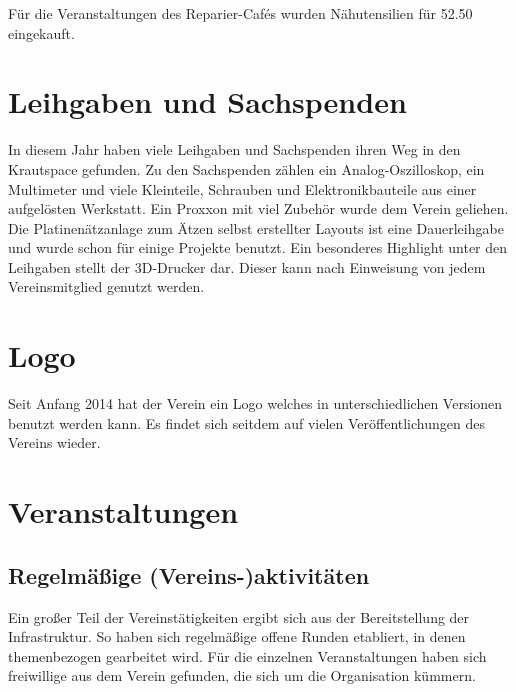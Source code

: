 \documentclass[ngerman,10pt,DIV16]{scrartcl}
\begin{document}
Für die Veranstaltungen des Reparier-Cafés wurden Nähutensilien für \SI{52,50}{\EUR} eingekauft.

\section{Leihgaben und Sachspenden}

In diesem Jahr haben viele Leihgaben und Sachspenden ihren Weg in den Krautspace gefunden. 
Zu den Sachspenden zählen ein Analog-Oszilloskop, ein Multimeter und viele Kleinteile, Schrauben und Elektronikbauteile aus einer aufgelösten Werkstatt.
Ein Proxxon mit viel Zubehör wurde dem Verein geliehen.
Die Platinenätzanlage zum Ätzen selbst erstellter Layouts ist eine Dauerleihgabe und wurde schon für einige Projekte benutzt.
Ein besonderes Highlight unter den Leihgaben stellt der 3D-Drucker dar.
Dieser kann nach Einweisung von jedem Vereinsmitglied genutzt werden.

\section{Logo}

Seit Anfang 2014 hat der Verein ein Logo welches in unterschiedlichen Versionen benutzt werden kann. 
Es findet sich seitdem auf vielen Veröffentlichungen des Vereins wieder. 

\section{Veranstaltungen}

\subsection{Regelmäßige (Vereins-)aktivitäten}

Ein großer Teil der Vereinstätigkeiten ergibt sich aus der
Bereitstellung der Infrastruktur. So haben sich regelmäßige offene Runden
etabliert, in denen themenbezogen gearbeitet wird. Für die
einzelnen Veranstaltungen haben sich freiwillige aus dem Verein
gefunden, die sich um die Organisation kümmern.
\end{document}
